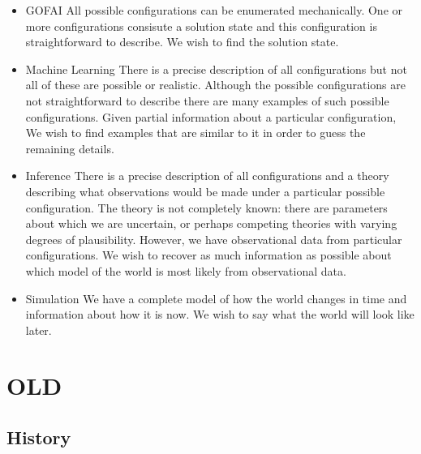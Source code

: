 \documentclass[10pt, a4paper, twocolumn]{article}
\begin{document}
\begin{itemize}
\item{GOFAI} All possible configurations can be enumerated mechanically. One or more
  configurations consisute a solution state and this configuration is
  straightforward to describe. We wish to find the solution state.
\item{Machine Learning} There is a precise description of all configurations but not all of these
  are possible or realistic. Although the possible configurations are not
  straightforward to describe there are many examples of such possible
  configurations. Given partial information about a particular configuration, We
  wish to find examples that are similar to it in order to guess the remaining details.
\item{Inference} There is a precise description of all configurations and a
  theory describing what observations would be made under a particular possible
  configuration. The theory is not completely known: there are parameters about
  which we are uncertain, or perhaps competing theories with varying degrees of
  plausibility. However, we have observational data from particular
  configurations. We wish to recover as much information as possible about which
  model of the world is most likely from observational data.
\item{Simulation} We have a complete model of how the world changes in time and
  information about how it is now. We wish to say what the world will look like later.
\end{itemize}

\newpage
\section{OLD}

\subsection{History}
\end{document}
